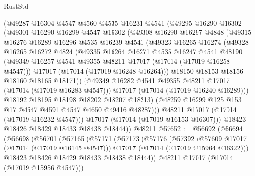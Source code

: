 \begin{lexlean}{RustStd}
\begin{coremodule}
{\begin{coremodule}
{{{{{{{{{{{{{{{{{{{{{{{{{{{{{{{{{{{{{{{{{{{{{{{{{{{{{{{          (@49287
            @16304
            @4547
            @4560
            @4535
            @16231
            @4541
            (@49295
              @16290
              @16302
              (@49301
                @16290
                @16299
                @4547
                @16302
                (@49308
                  @16290
                  @16297
                  @4848
                  (@49315
                    @16276
                    @16289
                    @16296
                    @4535
                    @16239
                    @4541
                    (@49323
                      @16265
                      @16274
                      (@49328
                        @16265
                        @16272
                        @4824
                        (@49335
                          @16264
                          @16271
                          @4535
                          @16247
                          @4541
                          @48190
                          (@49349 @16257 @4541 @49355 @48211 @17017 (@17014 (@17019 @16258 @4547)))
                          @17017
                          (@17014 (@17019 @16248 @16264)))
                        @18150
                        @18153
                        @18156
                        @18160
                        @18165
                        @18171))
                    (@49349 @16282 @4541 @49355 @48211 @17017 (@17014 (@17019 @16283 @4547)))
                    @17017
                    (@17014 (@17019 @16240 @16289)))
                  @18192
                  @18195
                  @18198
                  @18202
                  @18207
                  @18213)
                (@48259 @16299 @125 @153 @17 @4547 @4591 @4547 @4650 @49416 @48287)))
            @48211
            @17017
            (@17014 (@17019 @16232 @4547)))
          @17017
          (@17014 (@17019 @16153 @16307)))
        @18423
        @18426
        @18429
        @18433
        @18438
        @18444))
    @48211
@57652 := @56692
    (@56694
      (@56698
        (@56701
          (@57165
            (@57171
              (@57173
                (@57176
                  (@57392
                    (@57609 @17017 (@17014 (@17019 @16145 @4547)))
                    @17017
                    (@17014 (@17019 @15964 @16322)))
                  @18423
                  @18426
                  @18429
                  @18433
                  @18438
                  @18444))
              @48211
              @17017
              (@17014 (@17019 @15956 @4547)))
}}}}}}}}}}}}}}}}}}}}}}}}}}}}}}}}}}}}}}}}}}}}}}}}}}}}}}}
\end{coremodule}}
\end{coremodule}
\end{lexlean}
